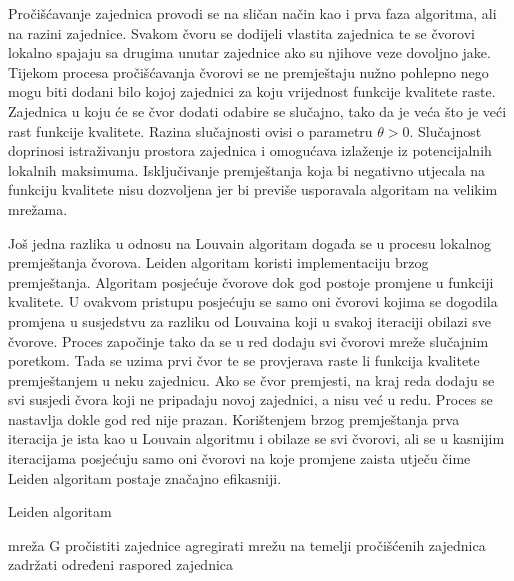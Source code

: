 Pročišćavanje zajednica provodi se na sličan način kao i prva faza algoritma, ali na razini zajednice. Svakom čvoru se dodijeli vlastita zajednica te se čvorovi lokalno spajaju sa drugima unutar zajednice ako su njihove veze dovoljno jake. Tijekom procesa pročišćavanja čvorovi se ne premještaju nužno pohlepno nego mogu biti dodani bilo kojoj zajednici za koju vrijednost funkcije kvalitete raste. Zajednica u koju će se čvor dodati odabire se slučajno, tako da je veća što je veći rast funkcije kvalitete. Razina slučajnosti ovisi o parametru $\theta > 0$. Slučajnost doprinosi istraživanju prostora zajednica i omogućava izlaženje iz potencijalnih lokalnih maksimuma. Isključivanje premještanja koja bi negativno utjecala na funkciju kvalitete nisu dozvoljena jer bi previše usporavala algoritam na velikim mrežama. 


Još jedna razlika u odnosu na Louvain algoritam događa se u procesu lokalnog premještanja čvorova. Leiden algoritam koristi implementaciju brzog premještanja. Algoritam posjećuje čvorove dok god postoje promjene u funkciji kvalitete. U ovakvom pristupu posjećuju se samo oni čvorovi kojima se dogodila promjena u susjedstvu za razliku od Louvaina koji u svakoj iteraciji obilazi sve čvorove. Proces započinje tako da se u red dodaju svi čvorovi mreže slučajnim poretkom. Tada se uzima prvi čvor te se provjerava raste li funkcija kvalitete premještanjem u neku zajednicu. Ako se čvor premjesti, na kraj reda dodaju se svi susjedi čvora koji ne pripadaju novoj zajednici, a nisu već u redu. Proces se nastavlja dokle god red nije prazan. Korištenjem brzog premještanja prva iteracija je ista kao u Louvain algoritmu i obilaze se svi čvorovi, ali se u kasnijim iteracijama posjećuju samo oni čvorovi na koje promjene zaista utječu čime Leiden algoritam postaje značajno efikasniji.


\begin{algorithm}
	\caption{Leiden algoritam}
	\begin{algorithmic}[1]
		\REQUIRE mreža G
		\REPEAT 
			 \ELSE
			 	\STATE pročistiti zajednice
			 	\STATE agregirati mrežu na temelji pročišćenih zajednica
			 	\STATE zadržati određeni raspored zajednica 
			 \ENDIF
		\UNTIL		
	\end{algorithmic}
\end{algorithm}



